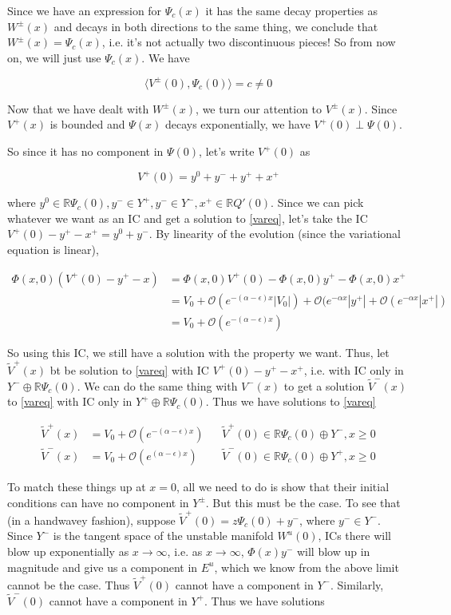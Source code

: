 \documentclass[12pt]{article}
\def\R{{\mathbb R}}
\begin{document}
Since we have an expression for $\Psi_c(x)$ it has the same decay properties as $W^\pm(x)$ and decays in both directions to the same thing, we conclude that $W^\pm(x) = \Psi_c(x)$, i.e. it's not actually two discontinuous pieces! So from now on, we will just use $\Psi_c(x)$. We have

\[
\langle V^\pm(0), \Psi_c(0) \rangle = c \neq 0
\]

Now that we have dealt with $W^\pm(x)$, we turn our attention to $V^\pm(x)$. Since $V^+(x)$ is bounded and $\Psi(x)$ decays exponentially, we have $V^+(0) \perp \Psi(0)$. 


So since it has no component in $\Psi(0)$, let's write $V^+(0)$ as

\[
V^+(0) = y^0 + y^- + y^+ + x^+
\]

where $y^0 \in \R \Psi_c(0), y^- \in Y^+, y^- \in Y^-, x^+ \in \R Q'(0)$. Since we can pick whatever we want as an IC and get a solution to \eqref{vareq}, let's take the IC $V^+(0) - y^+ - x^+ = y^0 + y^-$. By linearity of the evolution (since the variational equation is linear),

\begin{align*}
\Phi(x, 0)( V^+(0) - y^+ - x ) &= \Phi(x, 0)V^+(0) - \Phi(x, 0) y^+ - \Phi(x, 0) x^+ \\
&= V_0 + \mathcal{O}(e^{-(\alpha - \epsilon)x}|V_0|) + \mathcal{O}(e^{-\alpha x}|y^+| + 
\mathcal{O}(e^{-\alpha x}|x^+|) \\
&= V_0 + \mathcal{O}(e^{-(\alpha - \epsilon)x})
\end{align*}

So using this IC, we still have a solution with the property we want. Thus, let $\tilde{V}^+(x)$ bt be solution to \eqref{vareq} with IC $V^+(0) - y^+ - x^+$, i.e. with IC only in $Y^- \oplus \R \Psi_c(0)$. We can do the same thing with $V^-(x)$ to get a solution $\tilde{V}^-(x)$ to \eqref{vareq} with IC only in $Y^+ \oplus \R \Psi_c(0)$. Thus we have solutions to \eqref{vareq}

\begin{align*}
\tilde{V}^+(x) &= V_0 + \mathcal{O}(e^{-(\alpha - \epsilon)x}) && \tilde{V}^+(0) \in \R \Psi_c(0) \oplus Y^-, x \geq 0 \\
\tilde{V}^-(x) &= V_0 + \mathcal{O}(e^{(\alpha - \epsilon)x}) && \tilde{V}^-(0) \in \R \Psi_c(0) \oplus Y^+, x \geq 0
\end{align*}

To match these things up at $x = 0$, all we need to do is show that their initial conditions can have no component in $Y^\pm$. But this must be the case. To see that (in a handwavey fashion), suppose $\tilde{V}^+(0) = z \Psi_c(0) + y^-$, where $y^- \in Y^-$. Since $Y^-$ is the tangent space of the unstable manifold $W^u(0)$, ICs there will blow up exponentially as $x \rightarrow \infty$, i.e. as $x \rightarrow \infty$, $\Phi(x)y^-$ will blow up in magnitude and give us a component in $E^u$, which we know from the above limit cannot be the case. Thus $\tilde{V}^+(0)$ cannot have a component in $Y^-$. Similarly, $\tilde{V}^-(0)$ cannot have a component in $Y^+$. Thus we have solutions 
\end{document}
